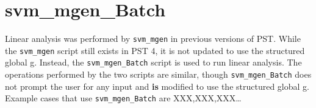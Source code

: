 \pagebreak
\section{svm\_mgen\_Batch}

Linear analysis was performed by \verb|svm_mgen| in previous versions of PST.
While the \verb|svm_mgen| script still exists in PST 4, it is not updated to use the structured global g.
Instead, the \verb|svm_mgen_Batch| script is used to run linear analysis.
The operations performed by the two scripts are similar, though \verb|svm_mgen_Batch| does not prompt the user for any input and \textbf{is} modified to use the structured global g.
Example cases that use \verb|svm_mgen_Batch| are XXX,XXX,XXX\ldots